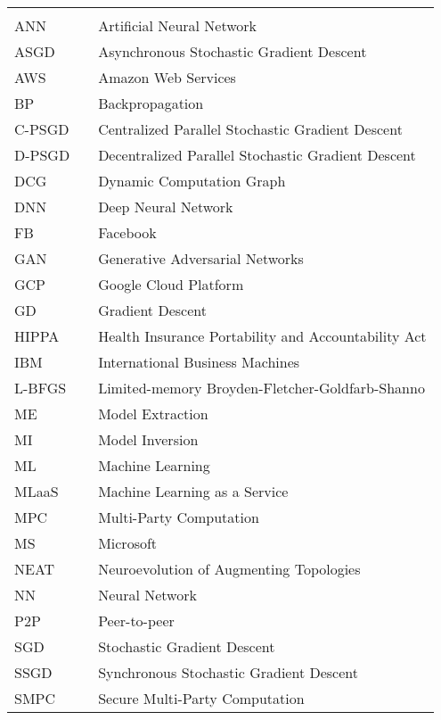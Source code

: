 \begin{center}
  \begin{tabular}{lll}
    \hspace*{2em} & \hspace*{1in} & \hspace*{4.5in} \\
    ANN   & \dotfill & Artificial Neural Network \\
    ASGD  & \dotfill & Asynchronous Stochastic Gradient Descent \\
    AWS   & \dotfill & Amazon Web Services \\
    BP    & \dotfill & Backpropagation \\
    C-PSGD & \dotfill & Centralized Parallel Stochastic Gradient Descent \\
    D-PSGD & \dotfill & Decentralized Parallel Stochastic Gradient Descent \\
    DCG   & \dotfill & Dynamic Computation Graph \\
    DNN   & \dotfill & Deep Neural Network \\
    FB    & \dotfill & Facebook \\
    GAN	  & \dotfill & Generative Adversarial Networks \\
    GCP   & \dotfill & Google Cloud Platform \\
    GD	  & \dotfill & Gradient Descent \\
    HIPPA & \dotfill & Health Insurance Portability and Accountability Act\\
    IBM   & \dotfill & International Business Machines \\
    L-BFGS & \dotfill & Limited-memory Broyden-Fletcher-Goldfarb-Shanno \\
    ME    & \dotfill & Model Extraction \\
    MI    & \dotfill & Model Inversion \\
    ML    & \dotfill & Machine Learning \\
    MLaaS & \dotfill & Machine Learning as a Service \\
    MPC	  & \dotfill & Multi-Party Computation \\
    MS    & \dotfill & Microsoft \\
    NEAT  & \dotfill & Neuroevolution of Augmenting Topologies \\
    NN	  & \dotfill & Neural Network \\
    P2P   & \dotfill & Peer-to-peer \\
    SGD	  & \dotfill & Stochastic Gradient Descent \\
    SSGD  & \dotfill & Synchronous Stochastic Gradient Descent \\
    SMPC  & \dotfill & Secure Multi-Party Computation \\
  \end{tabular}
\end{center}
\cleardoublepage


\newpage
\endofprelim
